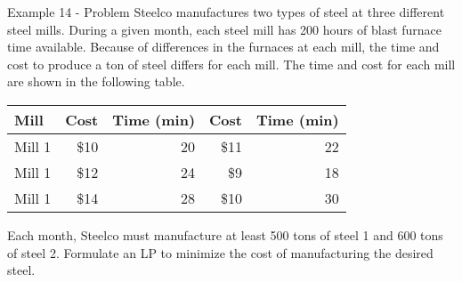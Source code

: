 \begin{frame}{Example 14 - Problem}
Steelco manufactures two types of steel at three different steel mills. During
a given month, each steel mill has 200 hours of blast furnace time available.
Because of differences in the furnaces at each mill, the time and cost to
produce a ton of steel differs for each mill. The time and cost for each mill
are shown in the following table.

\begin{center}
\begin{tabular}{lrrrr}
\hline
  \cellcolor{gray90}\textbf{Mill}
& \cellcolor{gray90}\textbf{Cost}
& \cellcolor{gray90}\textbf{Time (min)}
& \cellcolor{gray90}\textbf{Cost}
& \cellcolor{gray90}\textbf{Time (min)}\\
\hline
Mill 1 & \$10 & 20 & \$11 & 22 \\
Mill 1 & \$12 & 24 &  \$9 & 18 \\
Mill 1 & \$14 & 28 & \$10 & 30 \\
\hline
\end{tabular}
\end{center}

Each month, Steelco must manufacture at least 500 tons of steel 1 and 600 tons
of steel 2. Formulate an LP to minimize the cost of manufacturing the desired
steel.
\end{frame}
